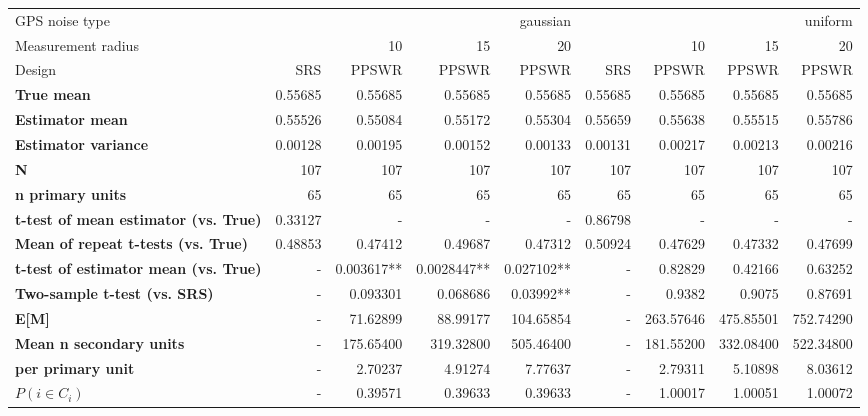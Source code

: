 \begin{tabular}{l|r|rrr|r|rrr}
\toprule
GPS noise type & \multicolumn{4}{r}{gaussian} & \multicolumn{4}{r}{uniform} \\
Measurement radius &  & 10 & 15 & 20 &  & 10 & 15 & 20 \\
Design & SRS & PPSWR & PPSWR & PPSWR & SRS & PPSWR & PPSWR & PPSWR \\
\midrule
\textbf{True mean} &  0.55685 &  0.55685 &  0.55685 &  0.55685 &  0.55685 &  0.55685 &  0.55685 &  0.55685 \\
\textbf{Estimator mean} & 0.55526 & 0.55084 & 0.55172 & 0.55304 & 0.55659 & 0.55638 & 0.55515 & 0.55786 \\
\textbf{Estimator variance} & 0.00128 & 0.00195 & 0.00152 & 0.00133 & 0.00131 & 0.00217 & 0.00213 & 0.00216 \\
\textbf{N} & 107 & 107 & 107 & 107 & 107 & 107 & 107 & 107 \\
\textbf{n primary units} & 65 & 65 & 65 & 65 & 65 & 65 & 65 & 65 \\
\textbf{t-test of mean estimator (vs. True)} & 0.33127 & - & - & - & 0.86798 & - & - & - \\
\textbf{Mean of repeat t-tests (vs. True)} & 0.48853 & 0.47412 & 0.49687 & 0.47312 & 0.50924 & 0.47629 & 0.47332 & 0.47699 \\
\textbf{t-test of estimator mean (vs. True)} & - & 0.003617** & 0.0028447** & 0.027102** & - & 0.82829 & 0.42166 & 0.63252 \\
\textbf{Two-sample t-test (vs. SRS)} & - & 0.093301 & 0.068686 & 0.03992** & - & 0.9382 & 0.9075 & 0.87691 \\
\textbf{E[M]} & - & 71.62899 & 88.99177 & 104.65854 & - & 263.57646 & 475.85501 & 752.74290 \\
\textbf{Mean n secondary units} & - & 175.65400 & 319.32800 & 505.46400 & - & 181.55200 & 332.08400 & 522.34800 \\
\textbf{     per primary unit} & - & 2.70237 & 4.91274 & 7.77637 & - & 2.79311 & 5.10898 & 8.03612 \\
\textbf{$P(i \in C_i)$} & - & 0.39571 & 0.39633 & 0.39633 & - & 1.00017 & 1.00051 & 1.00072 \\
\bottomrule
\end{tabular}
